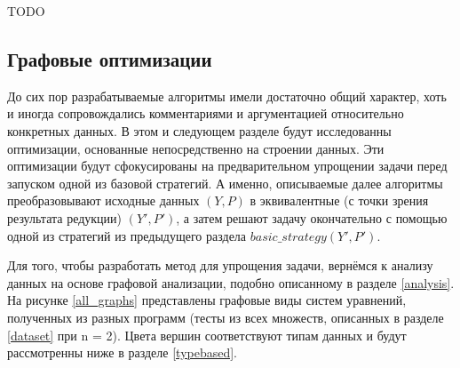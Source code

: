 \documentclass[../diploma.tex]{subfiles}
\begin{document}
TODO

\subsection{Графовые оптимизации}

До сих пор разрабатываемые алгоритмы имели достаточно общий характер, хоть и иногда сопровождались комментариями и аргументацией относительно конкретных данных. В этом и следующем разделе будут исследованны оптимизации, основанные непосредственно на строении данных. Эти оптимизации будут сфокусированы на предварительном упрощении задачи перед запуском одной из базовой стратегий. А именно, описываемые далее алгоритмы преобразовывают исходные данных $(Y, P)$ в эквивалентные (с точки зрения результата редукции) $(Y', P')$, а затем решают задачу окончательно с помощью одной из стратегий из предыдущего раздела $basic\_strategy(Y', P')$.

Для того, чтобы разработать метод для упрощения задачи, вернёмся к анализу данных на основе графовой анализации, подобно описанному в разделе \ref{analysis}. На рисунке \ref{all_graphs} представлены графовые виды систем уравнений, полученных из разных программ (тесты из всех множеств, описанных в разделе \ref{dataset} при n = 2). Цвета вершин соответствуют типам данных и будут рассмотренны ниже в разделе \ref{typebased}.

\captionsetup{justification   = raggedright,
              singlelinecheck = false}
\end{document}
